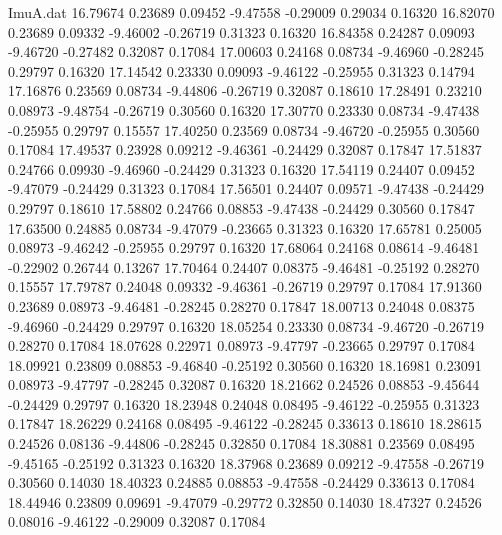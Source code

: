 \begin{filecontents}{ImuA.dat}
  16.79674    0.23689    0.09452   -9.47558   -0.29009    0.29034    0.16320
  16.82070    0.23689    0.09332   -9.46002   -0.26719    0.31323    0.16320
  16.84358    0.24287    0.09093   -9.46720   -0.27482    0.32087    0.17084
  17.00603    0.24168    0.08734   -9.46960   -0.28245    0.29797    0.16320
  17.14542    0.23330    0.09093   -9.46122   -0.25955    0.31323    0.14794
  17.16876    0.23569    0.08734   -9.44806   -0.26719    0.32087    0.18610
  17.28491    0.23210    0.08973   -9.48754   -0.26719    0.30560    0.16320
  17.30770    0.23330    0.08734   -9.47438   -0.25955    0.29797    0.15557
  17.40250    0.23569    0.08734   -9.46720   -0.25955    0.30560    0.17084
  17.49537    0.23928    0.09212   -9.46361   -0.24429    0.32087    0.17847
  17.51837    0.24766    0.09930   -9.46960   -0.24429    0.31323    0.16320
  17.54119    0.24407    0.09452   -9.47079   -0.24429    0.31323    0.17084
  17.56501    0.24407    0.09571   -9.47438   -0.24429    0.29797    0.18610
  17.58802    0.24766    0.08853   -9.47438   -0.24429    0.30560    0.17847
  17.63500    0.24885    0.08734   -9.47079   -0.23665    0.31323    0.16320
  17.65781    0.25005    0.08973   -9.46242   -0.25955    0.29797    0.16320
  17.68064    0.24168    0.08614   -9.46481   -0.22902    0.26744    0.13267
  17.70464    0.24407    0.08375   -9.46481   -0.25192    0.28270    0.15557
  17.79787    0.24048    0.09332   -9.46361   -0.26719    0.29797    0.17084
  17.91360    0.23689    0.08973   -9.46481   -0.28245    0.28270    0.17847
  18.00713    0.24048    0.08375   -9.46960   -0.24429    0.29797    0.16320
  18.05254    0.23330    0.08734   -9.46720   -0.26719    0.28270    0.17084
  18.07628    0.22971    0.08973   -9.47797   -0.23665    0.29797    0.17084
  18.09921    0.23809    0.08853   -9.46840   -0.25192    0.30560    0.16320
  18.16981    0.23091    0.08973   -9.47797   -0.28245    0.32087    0.16320
  18.21662    0.24526    0.08853   -9.45644   -0.24429    0.29797    0.16320
  18.23948    0.24048    0.08495   -9.46122   -0.25955    0.31323    0.17847
  18.26229    0.24168    0.08495   -9.46122   -0.28245    0.33613    0.18610
  18.28615    0.24526    0.08136   -9.44806   -0.28245    0.32850    0.17084
  18.30881    0.23569    0.08495   -9.45165   -0.25192    0.31323    0.16320
  18.37968    0.23689    0.09212   -9.47558   -0.26719    0.30560    0.14030
  18.40323    0.24885    0.08853   -9.47558   -0.24429    0.33613    0.17084
  18.44946    0.23809    0.09691   -9.47079   -0.29772    0.32850    0.14030
  18.47327    0.24526    0.08016   -9.46122   -0.29009    0.32087    0.17084

\end{filecontents}
